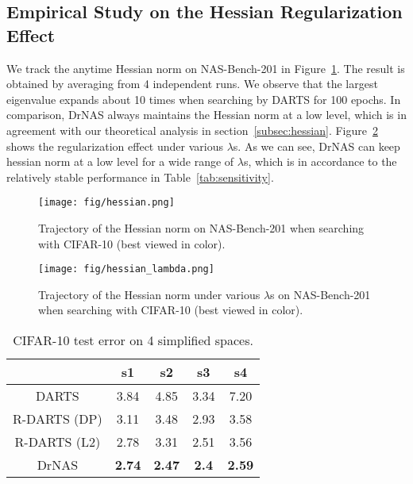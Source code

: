 \documentclass{article} \usepackage{iclr2021_conference,times}
\begin{document}
\subsection{Empirical Study on the Hessian Regularization Effect}
\label{app:hessian_plot}
We track the anytime Hessian norm on NAS-Bench-201 in Figure~\ref{fig:hessian}. 
The result is obtained by averaging from 4 independent runs.
We observe that the largest eigenvalue expands about 10 times when searching by DARTS for 100 epochs.
In comparison, DrNAS always maintains the Hessian norm at a low level, which is in agreement with our theoretical analysis in section~\ref{subsec:hessian}. Figure~\ref{fig:hessian_lambda} shows the regularization effect under various $\lambda$s. As we can see, DrNAS can keep hessian norm at a low level for a wide range of $\lambda$s, which is in accordance to the relatively stable performance in Table~\ref{tab:sensitivity}.

\begin{figure}[!htb]
\centering
\texttt{[image: fig/hessian.png]}
\caption{Trajectory of the Hessian norm on NAS-Bench-201 when searching with CIFAR-10 (best viewed in color).}
\label{fig:hessian}
\end{figure}

\begin{figure}[!htb]
\centering
\texttt{[image: fig/hessian\_lambda.png]}
\caption{Trajectory of the Hessian norm under various $\lambda$s on NAS-Bench-201 when searching with CIFAR-10 (best viewed in color).}
\label{fig:hessian_lambda}
\end{figure}

\begin{table}[htb]
\centering
\caption{CIFAR-10 test error on 4 simplified spaces.}
\begin{tabular}{c|c|c|c|c}
\hline
& s1 & s2 & s3 & s4 \\ \hline
DARTS & 3.84 & 4.85 & 3.34 & 7.20 \\ \hline
R-DARTS (DP) & 3.11 & 3.48 & 2.93 & 3.58 \\ \hline
R-DARTS (L2) & 2.78 & 3.31 & 2.51 & 3.56 \\ \hline
DrNAS & \textbf{2.74} & \textbf{2.47} & \textbf{2.4} & \textbf{2.59} \\ \hline
\end{tabular}
\label{tab:rdarts}
\end{table}
\end{document}
